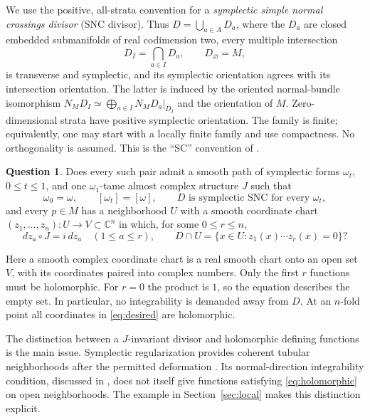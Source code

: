 \documentclass[11pt]{article}
\theoremstyle{definition}
\newtheorem{question}[theorem]{Question}
\theoremstyle{remark}
\newcommand{\C}{\mathbb C}
\begin{document}
We use the positive, all-strata convention for a \emph{symplectic simple normal crossings divisor} (SNC divisor). Thus $D=\bigcup_{a\in A}D_a$, where the $D_a$ are closed embedded submanifolds of real codimension two, every multiple intersection
\[
 D_I=\bigcap_{a\in I}D_a,\qquad D_\varnothing=M,
\]
is transverse and symplectic, and its symplectic orientation agrees with its intersection orientation. The latter is induced by the oriented normal-bundle isomorphism
$N_MD_I\simeq\bigoplus_{a\in I}N_MD_a|_{D_I}$ and the orientation of $M$.
Zero-dimensional strata have positive symplectic orientation. The family is finite; equivalently, one may start with a locally finite family and use compactness. No orthogonality is assumed. This is the ``SC'' convention of \cite[Definition 2.1]{TMZ}.

\begin{question}\label{q:main}
Does every such pair admit a smooth path of symplectic forms $\omega_t$, $0\leq t\leq1$, and one $\omega_1$-tame almost complex structure $J$ such that
\[
 \omega_0=\omega,\qquad [\omega_t]=[\omega],
 \qquad D\text{ is symplectic SNC for every }\omega_t,
\]
and every $p\in M$ has a neighborhood $U$ with a smooth coordinate chart $(z_1,\ldots,z_n):U\to V\subset\C^n$ in which, for some $0\leq r\leq n$,
\begin{equation}\label{eq:desired}
 dz_a\circ J=i\,dz_a\quad(1\leq a\leq r),
 \qquad D\cap U=\{x\in U:z_1(x)\cdots z_r(x)=0\}?
\end{equation}
\end{question}
Here a smooth complex coordinate chart is a real smooth chart onto an open set $V$, with its coordinates paired into complex numbers. Only the first $r$ functions must be holomorphic. For $r=0$ the product is $1$, so the equation describes the empty set. In particular, no integrability is demanded away from $D$. At an $n$-fold point all coordinates in \eqref{eq:desired} are holomorphic.

The distinction between a $J$-invariant divisor and holomorphic defining functions is the main issue. Symplectic regularization provides coherent tubular neighborhoods after the permitted deformation \cite[Theorem 2.13]{TMZ}. Its normal-direction integrability condition, discussed in \cite[Section 1.1]{TMZ}, does not itself give functions satisfying \eqref{eq:holomorphic} on open neighborhoods. The example in Section~\ref{sec:local} makes this distinction explicit.
\end{document}
